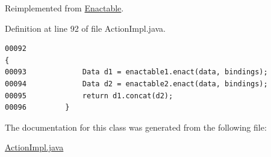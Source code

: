 Reimplemented from \hyperlink{interfaceEnactable_a0}{Enactable}.

Definition at line 92 of file Action\-Impl.java.\footnotesize\begin{verbatim}00092                                                                                    {
00093             Data d1 = enactable1.enact(data, bindings);
00094             Data d2 = enactable2.enact(data, bindings);
00095             return d1.concat(d2);
00096         }
\end{verbatim}\normalsize 


The documentation for this class was generated from the following file:\begin{CompactItemize}
\item 
\hyperlink{ActionImpl_8java-source}{Action\-Impl.java}\end{CompactItemize}
